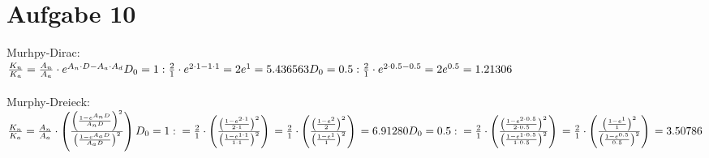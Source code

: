 \documentclass[a4paper]{scrartcl}
\begin{document}
\section*{Aufgabe 10}
Murhpy-Dirac:\\
$
\frac{K_n}{K_a} = \frac{A_n}{A_a} \cdot e^{A_n \cdot D - A_a \cdot A_d}\\
D_0 = 1:\\
\frac{2}{1} \cdot e^{2 \cdot 1 - 1 \cdot 1} = 2e^1 = 5.436563\\
\\
D_0 = 0.5:\\
\frac{2}{1} \cdot e^{2 \cdot 0.5 - 0.5} = 2e^{0.5} = 1.21306
$\\\\
Murphy-Dreieck:\\
$
\frac{K_n}{K_a} = \frac{A_n}{A_a} \cdot \left(
	\frac{
		\left(\frac{1-e^{A_nD}}{A_nD}\right)^2
	}
{
	\left(\frac{1-e^{A_aD}}{A_aD}\right)^2
}
\right)\\
D_0 = 1:\\
= \frac{2}{1} \cdot \left(
\frac{
	\left(\frac{1-e^{2 \cdot 1}}{2 \cdot 1}\right)^2
}
{
	\left(\frac{1-e^{1 \cdot 1}}{1 \cdot 1}\right)^2
}
\right)\\
= \frac{2}{1} \cdot \left(
\frac{
	\left(\frac{1-e^{2}}{2}\right)^2
}
{
	\left(\frac{1-e^{1}}{1}\right)^2
}
\right)\\
=6.91280
\\\\
D_0 = 0.5:\\
= \frac{2}{1} \cdot \left(
\frac{
	\left(\frac{1-e^{2 \cdot 0.5}}{2 \cdot 0.5}\right)^2
}
{
	\left(\frac{1-e^{1 \cdot 0.5}}{1 \cdot 0.5}\right)^2
}
\right)\\
= \frac{2}{1} \cdot \left(
\frac{
	\left(\frac{1-e^{1}}{1}\right)^2
}
{
	\left(\frac{1-e^{0.5}}{0.5}\right)^2
}
\right)\\
= 3.50786
$
\end{document}
